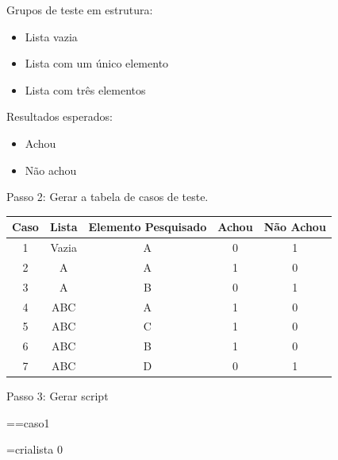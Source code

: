 \documentclass[
	12pt, %
]{fphw}
\begin{document}
\begin{doublespace}
\begin{enumerate}[label=\textbf{\arabic*)}]
              Grupos de teste em estrutura:

              \begin{itemize}
                  \item Lista vazia
                  \item Lista com um único elemento
                  \item Lista com três elementos
              \end{itemize}

              Resultados esperados:
              \begin{itemize}
                  \item Achou
                  \item Não achou
              \end{itemize}

              \pagebreak

              Passo 2: Gerar a tabela de casos de teste.

              \begin{center}
                  \begin{tabular}{ c c c c c }
                      Caso & Lista & Elemento Pesquisado & Achou & Não Achou \\
                      \hline
                      \hline
                      1    & Vazia & A                   & 0     & 1         \\
                      2    & A     & A                   & 1     & 0         \\
                      3    & A     & B                   & 0     & 1         \\
                      4    & ABC   & A                   & 1     & 0         \\
                      5    & ABC   & C                   & 1     & 0         \\
                      6    & ABC   & B                   & 1     & 0         \\
                      7    & ABC   & D                   & 0     & 1         \\
                  \end{tabular}
              \end{center}

              Passo 3: Gerar script

              ==caso1

              =crialista	0


\end{enumerate}
\end{doublespace}
\end{document}
